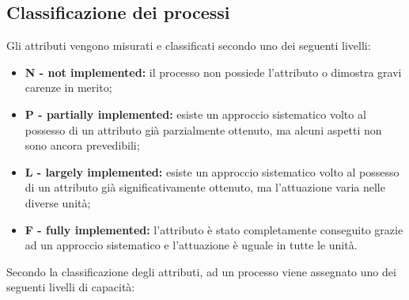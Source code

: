 \documentclass[openany,12pt,a4paper]{report}
\begin{document}
\subsection{Classificazione dei processi}

Gli attributi vengono misurati e classificati secondo uno dei seguenti livelli:

\begin{itemize}
    \item \textbf{N - not implemented:} il processo non possiede l'attributo o dimostra gravi carenze in merito;
    \item \textbf{P - partially implemented:} esiste un approccio sistematico volto al possesso di un attributo già parzialmente ottenuto, ma alcuni aspetti non sono ancora prevedibili;
    \item \textbf{L - largely implemented:} esiste un approccio sistematico volto al possesso di un attributo già significativamente ottenuto, ma l'attuazione varia nelle diverse unità;
    \item \textbf{F - fully implemented:} l'attributo è stato completamente conseguito grazie ad un approccio sistematico e l'attuazione è uguale in tutte le unità.
\end{itemize}

Secondo la classificazione degli attributi, ad un processo viene assegnato uno dei seguenti livelli di capacità:
\end{document}
